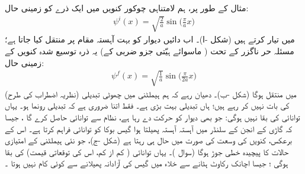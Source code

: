  مثال کے طور پر،  ہم لامتناہی چوکور کنویں میں ایک ذرے   کو زمینی حال:
\begin{align}
\psi^i (x) = \sqrt{\frac{2}{a}} \sin \big ( \frac{\pi}{a} x \big )
\end{align}
 میں تیار کرتے ہیں (شکل -ا)۔  اب دائیں  دیوار کو بہت آہستہ  مقام  پر منتقل کیا جاتا ہے؛  مسئلہ حر ناگزر کے تحت ( ماسوائے ہیّتی  جزو ضربی  کے)  یہ ذرہ توسیع شدہ کنویں کے زمینی حال:
\begin{align}
\psi^f (x) = \sqrt{\frac{1}{a}} \sin \big ( \frac{\pi}{2a} x \big )
\end{align}
 میں منتقل ہوگا  (شکل  -ب)۔ دھیان رہے کہ  ہم ہیملٹنی میں   چھوٹی تبدیلی     (نظریہ اضطراب کی طرح)  کی بات نہیں کر رہے ہیں؛ ہاں تبدیلی بہت بڑی ہے۔  فقط اتنا ضروری  ہے کہ تبدیلی    رونما ہو۔ یہاں توانائی کی بقا نہیں ہوگی: جو بھی دیوار کو حرکت دے رہا ہے،  نظام سے توانائی حاصل کرے گا ، جیسا  کہ  گاڑی کے  انجن کے سلنڈر   میں آہستہ آہستہ پھیلتا ہوا گیس بوکا کو توانائی فراہم کرتا ہے۔ اس کے برعکس،  کنویں کی  وسعت کی صورت میں   حال  ہی رہتا ہے  (شکل  -ج)،    جو نئی  ہیملٹنی کے امتیازی حالات کا  پیچیدہ خطی جوڑ ہوگا  (سوال )۔ یہاں توانائی  ( کم  از کم،  اس کی توقعاتی قیمت) کی   بقا ہوگی ؛  جیسا اچانک رکاوٹ ہٹانے سے خلاء میں گیس کی آزادانہ پھیلانے  سے کوئی کام نہیں ہوتا ۔


